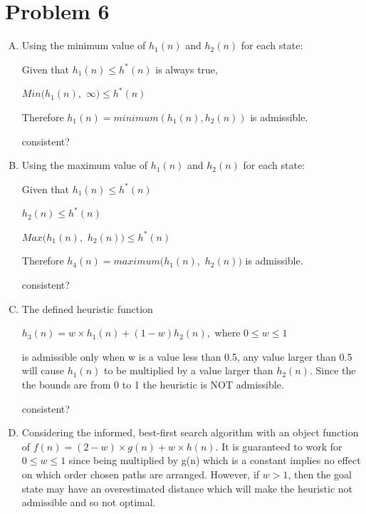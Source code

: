 \documentclass[10pt,a4paper]{article}
\begin{document}
	\section*{Problem 6}
	\begin{enumerate}[A.]
		\item
		Using the minimum value of $h_1(n)$ and $h_2(n)$ for each state:
		
		\begin{center}
			Given that $h_1(n) \leq h^*(n)$ is always true, 
			
			$Min(h_1(n),$ $\infty) \leq h^*(n)$
		
			Therefore $h_1(n) = minimum (h_1(n), h_2(n))$ is admissible. 
			
			consistent? 
		
		\end{center}
		
		\item
		Using the maximum value of $h_1(n)$ and $h_2(n)$ for each state:
		
		\begin{center}
			
			Given that $h_1(n) \leq h^*(n)$
			
			$h_2(n) \leq h^*(n)$
			
			$Max(h_1(n),$ $h_2(n)) \leq h^*(n)$
			
			Therefore $h_4(n) = maximum(h_1(n),$ $h_2(n))$ is admissible.
			
			consistent? 
			
		\end{center}
		
		
		\item
		The defined heuristic function 
		\begin{center}
			$h_3(n) = w \times h_1(n) + (1-w)h_2(n),$ where $0 \leq w \leq 1$
		\end{center}
		
		is admissible only when w is a value less than 0.5, any value larger than 0.5 will cause $h_1(n)$ to be multiplied by a value larger than $h_2(n)$.  Since the the bounds are from 0 to 1 the heuristic is NOT admissible. 
			
			
			consistent? 
			
		
		
		\item
		Considering the informed, best-first search algorithm with an object function of $f(n) = (2-w) \times g(n) + w \times h(n)$. It is guaranteed to work for $0 \leq w \leq 1$ since being multiplied by g(n) which is a constant implies no effect on which order chosen paths are arranged. However, if $w > 1$, then the goal state may have an overestimated distance which will make the heuristic not admissible and so not optimal.
		

\end{enumerate}
\end{document}
